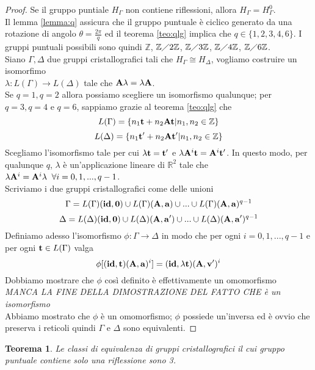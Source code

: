 \documentclass[a4paper,11pt,openright,twoside	]{book}
\newtheorem{theorem}{Teorema}[section]
\begin{document}
\begin{proof}
Se il gruppo puntiale $H_{\Gamma}$ non contiene riflessioni, allora $H_{\Gamma} = H_{\Gamma}^0$.\\
Il lemma \ref{lemma:q} assicura che il gruppo puntuale è ciclico generato da una rotazione di angolo $\theta = \frac{2 \pi}{q}$ ed il teorema \ref{teo:qlg} implica che $q \in \{ 1, 2, 3, 4, 6\}$. I gruppi puntuali possibili sono quindi $\mathbb{Z}$, $\mathbb{Z} \diagup 2 \mathbb{Z}$, $\mathbb{Z} \diagup 3 \mathbb{Z}$, $\mathbb{Z} \diagup 4 \mathbb{Z}$, $\mathbb{Z} \diagup 6 \mathbb{Z}$. \\
Siano $\Gamma, \Delta$ due gruppi cristallografici tali che $H_{\Gamma} \cong H_{\Delta}$, vogliamo costruire un isomorfimo \\
$\lambda: L(\Gamma) \longrightarrow L(\Delta)$ tale che $\vb{A} \lambda = \lambda \vb{A}$. \\
Se $q = 1, q=2$ allora possiamo scegliere un isomorfismo qualunque; per $q=3, q=4$ e $q=6$, sappiamo grazie al teorema \ref{teo:qlg} che 
\[ L(\Gamma) = \{ n_1 \vb{t} + n_2 \vb{A} \vb{t} | n_1, n_2 \in \mathbb{Z} \}\]
\[L(\Delta) = \{ n_1 \vb{t'} + n_2 \vb{A} \vb{t'} | n_1, n_2 \in \mathbb{Z} \} \]
Scegliamo l'isomorfismo tale per cui $\lambda \vb{t} = \vb{t'}$  e $\lambda \vb{A}^i \vb{t} = \vb{A}^i \vb{t'}$. 
In questo modo, per qualunque $q$, $\lambda$ è un'applicazione lineare di $\mathbb{R}^2$ tale che $\lambda \vb{A}^i =  \vb{A}^i \lambda \; \; \forall i = 0, 1,...,q-1$. \\
Scriviamo i due gruppi cristallografici come delle unioni
\[ \Gamma = L(\Gamma)(\vb{id, 0}) \cup L(\Gamma)(\vb{A, a}) \cup ... \cup L(\Gamma)(\vb{A, a})^{q-1} \]
\[ \Delta = L(\Delta)(\vb{id, 0}) \cup L(\Delta)(\vb{A, a'}) \cup ... \cup L(\Delta)(\vb{A, a'})^{q-1} \]
Definiamo adesso l'isomorfismo $\phi : \Gamma \longrightarrow \Delta$ in modo che per ogni $i = 0, 1,...,q-1$ e per ogni $\vb{t} \in L(\Gamma)$ valga 
\[ \phi[(\vb{id, t})(\vb{A, a})^i] = (\vb{id}, \lambda\vb{t})(\vb{A, v'})^i \]
Dobbiamo mostrare che $\phi$ così definito è effettivamente un omomorfismo \\
\emph{MANCA LA FINE DELLA DIMOSTRAZIONE DEL FATTO CHE è un isomorfismo} \\
Abbiamo mostrato che $\phi$ è un omomorfismo; $\phi$ possiede un'inversa ed è ovvio che preserva i reticoli quindi $\Gamma$ e $\Delta$ sono equivalenti.  
\end{proof}

\begin{theorem}
Le classi di equivalenza di gruppi cristallografici il cui gruppo puntuale contiene solo una riflessione sono 3.
\end{theorem}
\end{document}

